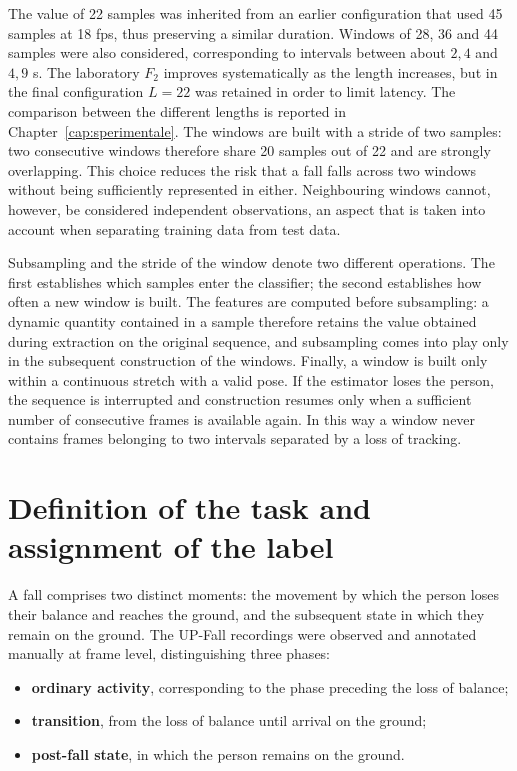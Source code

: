 The value of 22 samples was inherited from an earlier configuration that used 45 samples at 18 fps, thus preserving a similar duration. Windows of 28, 36 and 44 samples were also considered, corresponding to intervals between about $2{,}4$ and $4{,}9$ s. The laboratory $F_2$ improves systematically as the length increases, but in the final configuration $L=22$ was retained in order to limit latency. The comparison between the different lengths is reported in Chapter~\ref{cap:sperimentale}. The windows are built with a stride of two samples: two consecutive windows therefore share 20 samples out of 22 and are strongly overlapping. This choice reduces the risk that a fall falls across two windows without being sufficiently represented in either. Neighbouring windows cannot, however, be considered independent observations, an aspect that is taken into account when separating training data from test data.

Subsampling and the stride of the window denote two different operations. The first establishes which samples enter the classifier; the second establishes how often a new window is built. The features are computed before subsampling: a dynamic quantity contained in a sample therefore retains the value obtained during extraction on the original sequence, and subsampling comes into play only in the subsequent construction of the windows. Finally, a window is built only within a continuous stretch with a valid pose. If the estimator loses the person, the sequence is interrupted and construction resumes only when a sufficient number of consecutive frames is available again. In this way a window never contains frames belonging to two intervals separated by a loss of tracking.

\section{Definition of the task and assignment of the label}
\label{sec:compito}

A fall comprises two distinct moments: the movement by which the person loses their balance and reaches the ground, and the subsequent state in which they remain on the ground. The UP-Fall recordings were observed and annotated manually at frame level, distinguishing three phases:
\begin{itemize}
    \item \textbf{ordinary activity}, corresponding to the phase preceding the loss of balance;
    \item \textbf{transition}, from the loss of balance until arrival on the ground;
    \item \textbf{post-fall state}, in which the person remains on the ground.
\end{itemize}

